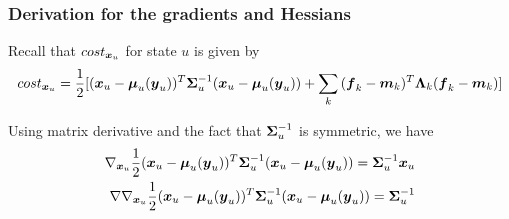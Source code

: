 \begin{frame}[t]
    \frametitle{Derivation for the gradients and Hessians}
    Recall that $cost_{\boldsymbol{x}_{u}}$ for state $u$ is given by
    \begin{align}
        cost_{\boldsymbol{x}_{u}}
        =
            \frac{1}{2}[(\boldsymbol{x}_{u} - \boldsymbol{\mu}_{u}(\boldsymbol{y}_{u}))^T\boldsymbol{\Sigma}_{u}^{-1}(\boldsymbol{x}_{u} - \boldsymbol{\mu}_{u}(\boldsymbol{y}_{u}))
            + \sum_k{
                (\boldsymbol{f}_{k} - \boldsymbol{m}_{k})^T\boldsymbol{\Lambda}_{k}(\boldsymbol{f}_{k} - \boldsymbol{m}_{k})        
            }]
        \nonumber
    \end{align}
    
    \vspace{\baselineskip}
    Using matrix derivative and the fact that $\boldsymbol{\Sigma}_{u}^{-1}$ is symmetric, we have
    \begin{align}
        \nabla_{\boldsymbol{x}_{u}}\frac{1}{2}(\boldsymbol{x}_{u} - \boldsymbol{\mu}_{u}(\boldsymbol{y}_{u}))^T\boldsymbol{\Sigma}_{u}^{-1}(\boldsymbol{x}_{u} - \boldsymbol{\mu}_{u}(\boldsymbol{y}_{u})) 
        = \boldsymbol{\Sigma}_{u}^{-1}\boldsymbol{x}_{u}
        \label{eq-laplace-mu-gradient}
        \\
        \nabla\nabla_{\boldsymbol{x}_{u}}\frac{1}{2}(\boldsymbol{x}_{u} - \boldsymbol{\mu}_{u}(\boldsymbol{y}_{u}))^T\boldsymbol{\Sigma}_{u}^{-1}(\boldsymbol{x}_{u} - \boldsymbol{\mu}_{u}(\boldsymbol{y}_{u})) 
        = \boldsymbol{\Sigma}_{u}^{-1}
        \label{eq-laplace-mu-hessian}
    \end{align}    
\end{frame}

